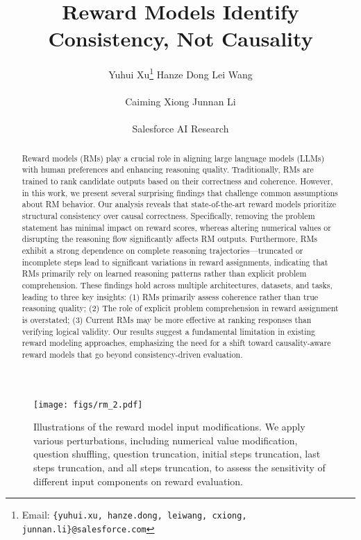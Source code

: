 \documentclass{article}
\title{Reward Models Identify Consistency, Not Causality}
\author{Yuhui Xu\thanks{Email: \texttt{\{yuhui.xu, hanze.dong, leiwang, cxiong, junnan.li\}@salesforce.com}} \qquad Hanze Dong \qquad Lei Wang \\\\ 
 Caiming Xiong \qquad Junnan Li
\\\\
Salesforce AI Research}
\date{}
\begin{document}
\maketitle




\begin{abstract}
Reward models (RMs) play a crucial role in aligning large language models (LLMs) with human preferences and enhancing reasoning quality. Traditionally, RMs are trained to rank candidate outputs based on their correctness and coherence. However, in this work, we present several surprising findings that challenge common assumptions about RM behavior. Our analysis reveals that state-of-the-art reward models prioritize structural consistency over causal correctness. Specifically, removing the problem statement has minimal impact on reward scores, whereas altering numerical values or disrupting the reasoning flow significantly affects RM outputs. Furthermore, RMs exhibit a strong dependence on complete reasoning trajectories—truncated or incomplete steps lead to significant variations in reward assignments, indicating that RMs primarily rely on learned reasoning patterns rather than explicit problem comprehension.  These findings hold across multiple architectures, datasets, and tasks, leading to three key insights: (1) RMs primarily assess coherence rather than true reasoning quality; (2) The role of explicit problem comprehension in reward assignment is overstated; (3) Current RMs may be more effective at ranking responses than verifying logical validity. Our results suggest a fundamental limitation in existing reward modeling approaches, emphasizing the need for a shift toward causality-aware reward models that go beyond consistency-driven evaluation.

\end{abstract}

\setlength{\parindent}{0pt}
\setlength{\parskip}{8pt}
\newpage 
\tableofcontents
\newpage 

\begin{figure}[!ht]
    \centering
    \texttt{[image: figs/rm\_2.pdf]}
    \caption{Illustrations of the reward model input modifications. We apply various perturbations, including numerical value modification, question shuffling, question truncation, initial steps truncation, last steps truncation, and all steps truncation, to assess the sensitivity of different input components on reward evaluation.}
    \label{fig:framework}
\end{figure}
\end{document}
